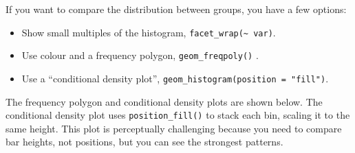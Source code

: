 If you want to compare the distribution between groups, you have a few
options:

\begin{itemize}
\tightlist
\item
  Show small multiples of the histogram,
  \texttt{facet\_wrap(\textasciitilde{}\ var)}.
\item
  Use colour and a frequency polygon, \texttt{geom\_freqpoly()} .
   
\item
  Use a ``conditional density plot'',
  \texttt{geom\_histogram(position\ =\ "fill")}.
\end{itemize}

The frequency polygon and conditional density plots are shown below. The
conditional density plot uses \texttt{position\_fill()} to stack each
bin, scaling it to the same height. This plot is perceptually
challenging because you need to compare bar heights, not positions, but
you can see the strongest patterns. 

\begin{Shaded}
\begin{Highlighting}[]
\OperatorTok{+}\StringTok{ }
\StringTok{  }\NormalTok{(}\NormalTok{(} \NormalTok{, } \NormalTok{) }\OperatorTok{+}
\StringTok{  }\NormalTok{(}\NormalTok{, }\NormalTok{) }\OperatorTok{+}\StringTok{ }
\StringTok{  }\NormalTok{(} \NormalTok{)}
\OperatorTok{+}\StringTok{ }
\StringTok{  }\NormalTok{(}\NormalTok{(} \NormalTok{, } \NormalTok{,}
     \NormalTok{) }\OperatorTok{+}
\StringTok{  }\NormalTok{(}\NormalTok{, }\NormalTok{) }\OperatorTok{+}\StringTok{ }
\StringTok{  }\NormalTok{(} \NormalTok{)}
\end{Highlighting}
\end{Shaded}

